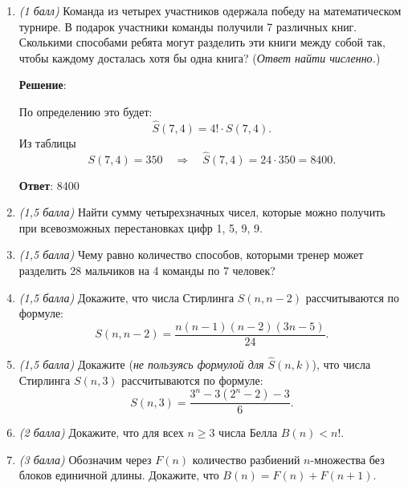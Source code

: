 \documentclass{article}
\begin{document}
\begin{enumerate}

    \item \textit{(1 балл)} Команда из четырех участников одержала победу на математическом турнире. В подарок участники команды получили 7 различных книг. Сколькими способами ребята могут разделить эти книги между собой так, чтобы каждому досталась хотя бы одна книга? (\textit{Ответ найти численно.})
    
    \textbf{Решение}:
    
    По определению это будет:
    \begin{equation}
        \widehat{S}(7,4) = 4! \cdot S(7,4).
    \end{equation}
    Из таблицы
    \begin{equation}
        S(7,4) = 350 \quad \Rightarrow \quad \widehat{S}(7,4) = 24 \cdot 350 = 8400.
    \end{equation}

    \textbf{Ответ}:
    8400

    \item \textit{(1,5 балла)} Найти сумму четырехзначных чисел, которые можно получить при всевозможных перестановках цифр 1, 5, 9, 9.
    
    \item \textit{(1,5 балла)} Чему равно количество способов, которыми тренер может разделить 28 мальчиков на 4 команды по 7 человек?
    
    \item \textit{(1,5 балла)} Докажите, что числа Стирлинга $S(n,n-2)$ рассчитываются по формуле:
    $$S(n,n-2)=\frac{n(n-1)(n-2)(3n-5)}{24}.$$
    
    \item \textit{(1,5 балла)} Докажите (\textit{не пользуясь формулой для $\hat{S}(n,k)$}), что числа Стирлинга $S(n,3)$ рассчитываются по формуле:
    $$S(n,3)=\frac{3^n-3(2^n-2)-3}{6}.$$
    
    \item \textit{(2 балла)} Докажите, что для всех $n\geq3$ числа Белла $B(n)<n!$.
    
    \item \textit{(3 балла)} Обозначим через $F(n)$ количество разбиений $n$-множества без блоков единичной длины. Докажите, что $B(n) = F(n) + F(n+1)$.
    
    \end{enumerate}
\end{document}
